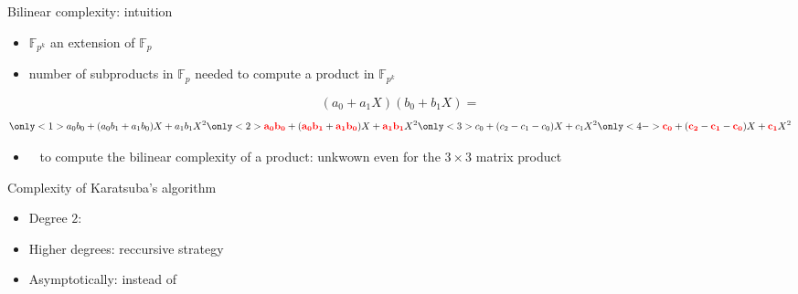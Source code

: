 \documentclass[xcolor=x11names,compress, aspectratio=43]{beamer}
\begin{document}
\begin{frame}{Bilinear complexity: intuition}
  \begin{itemize}
    \item $\mathbb{F}_{p^k}$ an extension of $\mathbb{F}_p$
    \item {} number of subproducts in $\mathbb{F}_p$
      needed to compute a product in $\mathbb{F}_{p^k}$
  \end{itemize}
\[(a_0+ a_1 X)(b_0 + b_1 X) = \]
\[
  \only<1>{a_0b_0+(a_0b_1+a_1b_0)X+a_1b_1X^2}
  \only<2>{\textcolor{red}{\mathbf{a_0b_0}}+(\frb{a_0b_1}+\frb{a_1b_0})X+\frb{a_1b_1}X^2}
  \only<3>{c_0+(c_2-c_1-c_0)X+c_1X^2}
  \only<4->{\frb{c_0}+(\frb{c_2}-\frb{c_1}-\frb{c_0})X+\frb{c_1}X^2}
\]
\begin{itemize}
  \item<5-> \bad~ to compute the bilinear complexity of a product:
    unkwown even for the $3\times3$ matrix product
\end{itemize}
\end{frame}

\begin{frame}{Complexity of Karatsuba's algorithm}
  \begin{center}
  \end{center}
  \begin{itemize}
    \item<2->Degree $2$: 
    \item<3->Higher degrees: reccursive strategy
    \item<4->Asymptotically:  instead of 
  \end{itemize}
\end{frame}
\end{document}
